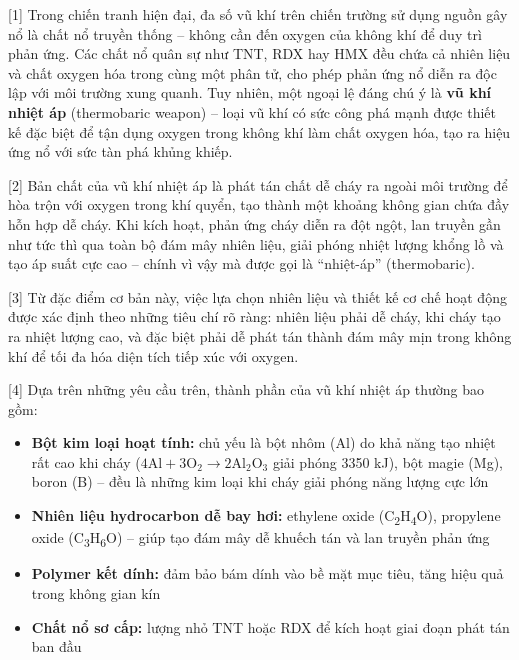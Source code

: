 \documentclass[12pt,a4paper,twoside]{article}
\newenvironment{readingpassage}[1][]{%
    \begin{tcolorbox}[enhanced, colback=grayLight, colframe=secondaryBlue,
        coltitle=textDark, fonttitle=\bfseries, title={#1},
        rounded corners, arc=3mm, boxrule=1pt,
        left=15pt, right=15pt, top=10pt, bottom=10pt,
        breakable, before skip=10pt, after skip=10pt, drop fuzzy shadow]
    \setstretch{1.3}
}{\end{tcolorbox}}
\begin{document}
\begin{readingpassage}[]


[1] Trong chiến tranh hiện đại, đa số vũ khí trên chiến trường sử dụng nguồn gây nổ là chất nổ truyền thống -- không cần đến oxygen của không khí để duy trì phản ứng. Các chất nổ quân sự như TNT, RDX hay HMX đều chứa cả nhiên liệu và chất oxygen hóa trong cùng một phân tử, cho phép phản ứng nổ diễn ra độc lập với môi trường xung quanh. Tuy nhiên, một ngoại lệ đáng chú ý là \textbf{vũ khí nhiệt áp} (thermobaric weapon) -- loại vũ khí có sức công phá mạnh được thiết kế đặc biệt để tận dụng oxygen trong không khí làm chất oxygen hóa, tạo ra hiệu ứng nổ với sức tàn phá khủng khiếp.

[2] Bản chất của vũ khí nhiệt áp là phát tán chất dễ cháy ra ngoài môi trường để hòa trộn với oxygen trong khí quyển, tạo thành một khoảng không gian chứa đầy hỗn hợp dễ cháy. Khi kích hoạt, phản ứng cháy diễn ra đột ngột, lan truyền gần như tức thì qua toàn bộ đám mây nhiên liệu, giải phóng nhiệt lượng khổng lồ và tạo áp suất cực cao -- chính vì vậy mà được gọi là ``nhiệt-áp'' (thermobaric).

[3] Từ đặc điểm cơ bản này, việc lựa chọn nhiên liệu và thiết kế cơ chế hoạt động được xác định theo những tiêu chí rõ ràng: nhiên liệu phải dễ cháy, khi cháy tạo ra nhiệt lượng cao, và đặc biệt phải dễ phát tán thành đám mây mịn trong không khí để tối đa hóa diện tích tiếp xúc với oxygen.

[4] Dựa trên những yêu cầu trên, thành phần của vũ khí nhiệt áp thường bao gồm:

\begin{itemize}[leftmargin=2em, itemsep=2pt]
\item[\textcolor{accentBlue}{\textbf{--}}] \textbf{Bột kim loại hoạt tính:} chủ yếu là bột nhôm (Al) do khả năng tạo nhiệt rất cao khi cháy ($4\text{Al} + 3\text{O}_2 \rightarrow 2\text{Al}_2\text{O}_3$ giải phóng 3350 kJ), bột magie (Mg), boron (B) -- đều là những kim loại khi cháy giải phóng năng lượng cực lớn
\item[\textcolor{accentBlue}{\textbf{--}}] \textbf{Nhiên liệu hydrocarbon dễ bay hơi:} ethylene oxide (C\textsubscript{2}H\textsubscript{4}O), propylene oxide (C\textsubscript{3}H\textsubscript{6}O) -- giúp tạo đám mây dễ khuếch tán và lan truyền phản ứng
\item[\textcolor{accentBlue}{\textbf{--}}] \textbf{Polymer kết dính:} đảm bảo bám dính vào bề mặt mục tiêu, tăng hiệu quả trong không gian kín
\item[\textcolor{accentBlue}{\textbf{--}}] \textbf{Chất nổ sơ cấp:} lượng nhỏ TNT hoặc RDX để kích hoạt giai đoạn phát tán ban đầu
\end{itemize}


\end{readingpassage}
\end{document}
